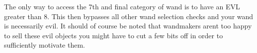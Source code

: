 The only way to access the 7th and final category of wand is to have an EVL greater than 8. This then bypasses all other wand selection checks\comma{} and your wand is necessarily evil. It should of course be noted that wandmakers aren{\apos}t too happy to sell these evil objects \minus{}\minus{} you might have to cut a few bits off in order to sufficiently motivate them.  


\newpage








